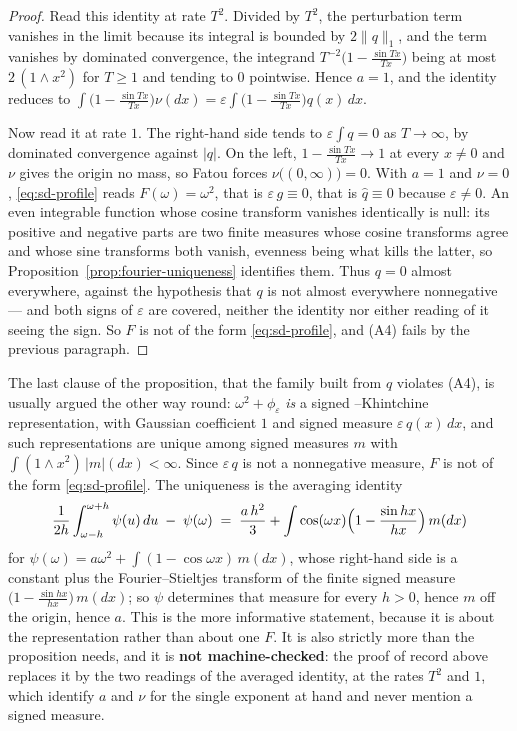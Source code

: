\begin{proof}
Read this identity at rate $T^2$. Divided by $T^2$, the perturbation term vanishes in the limit
because its integral is bounded by $2\|q\|_1$, and the \Levy{} term vanishes by dominated
convergence, the integrand $T^{-2}\bigl(1 - \frac{\sin Tx}{Tx}\bigr)$ being at most
$2\,(1 \wedge x^2)$ for $T \ge 1$ and tending to $0$ pointwise. Hence $a = 1$, and the identity
reduces to
$\int \bigl(1 - \frac{\sin Tx}{Tx}\bigr)\nu(dx)
 = \varepsilon\int \bigl(1 - \frac{\sin Tx}{Tx}\bigr) q(x)\,dx$.

Now read it at rate $1$. The right-hand side tends to $\varepsilon \int q = 0$ as
$T \to \infty$, by dominated convergence against $|q|$. On the left,
$1 - \frac{\sin Tx}{Tx} \to 1$ at every $x \ne 0$ and $\nu$ gives the origin no mass, so Fatou
forces $\nu\bigl((0,\infty)\bigr) = 0$. With $a = 1$ and $\nu = 0$, \ref{eq:sd-profile} reads
$F(\omega) = \omega^2$, that is $\varepsilon\,g \equiv 0$, that is $\hat q \equiv 0$ because
$\varepsilon \ne 0$. An even integrable function whose cosine transform vanishes identically is
null: its positive and negative parts are two finite measures whose cosine transforms agree and
whose sine transforms both vanish, evenness being what kills the latter, so
Proposition~\ref{prop:fourier-uniqueness} identifies them. Thus $q = 0$ almost everywhere,
against the hypothesis that $q$ is not almost everywhere nonnegative --- and both signs of
$\varepsilon$ are covered, neither the identity nor either reading of it seeing the sign. So
$F$ is not of the form \ref{eq:sd-profile}, and (A4) fails by the previous paragraph.
\end{proof}

\begin{remark}\label{rem:signed-levy-uniqueness}
The last clause of the proposition, that the family built from $q$ violates (A4), is usually
argued the other way round: $\omega^2 + \phi_\varepsilon$ \emph{is} a
signed \Levy--Khintchine representation, with Gaussian coefficient $1$ and signed measure
$\varepsilon\,q(x)\,dx$, and such representations are unique among signed measures $m$ with
$\int (1 \wedge x^2)\,|m|(dx) < \infty$. Since $\varepsilon\,q$ is not a nonnegative measure,
$F$ is not of the form \ref{eq:sd-profile}. The uniqueness is the averaging identity
\[
  \frac{1}{2h}\int_{\omega-h}^{\omega+h}\psi(u)\,du \;-\; \psi(\omega)
  \;=\; \frac{a\,h^2}{3}
   + \int \cos(\omega x)\Bigl(1 - \frac{\sin hx}{hx}\Bigr)\,m(dx)
\]
for $\psi(\omega) = a\omega^2 + \int (1-\cos\omega x)\,m(dx)$, whose right-hand side is a
constant plus the Fourier--Stieltjes transform of the finite signed measure
$\bigl(1 - \frac{\sin hx}{hx}\bigr)\,m(dx)$; so $\psi$ determines that measure for every
$h > 0$, hence $m$ off the origin, hence $a$. This is the more informative statement, because
it is about the representation rather than about one $F$. It is
also strictly more than the proposition needs, and it is \textbf{not machine-checked}: the
proof of record above replaces it by the two readings of the averaged identity, at the
rates $T^2$ and $1$, which identify $a$ and $\nu$
for the single exponent at hand and never mention a signed measure.
\end{remark}

